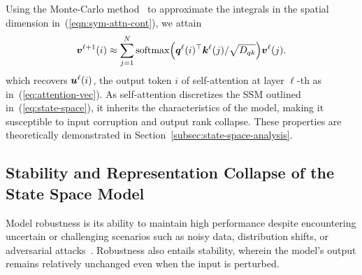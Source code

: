 Using the Monte-Carlo method~\cite{13ab5b5e-0237-33fb-a7a8-6f6e4e0d4e0f} to approximate the integrals in the spatial dimension in~(\ref{eqn:sym-attn-cont}), we attain 
\begin{equation}
\nonumber
\bm{v}^{\ell + 1}(i) \approx \sum_{j=1}^N{\rm softmax}\Big({{\bm q}}^{\ell}(i)^\top{{\bm k}}^{\ell}(j)/\sqrt{D_{qk}}\Big){{\bm v}}^{\ell}(j).
\end{equation}
which recovers ${\bm u}^{\ell}(i)$, the output token $i$ of self-attention at layer $\ell$-th as in~(\ref{eq:attention-vec}). As self-attention discretizes the SSM outlined in~(\ref{eq:state-space}), it inherits the characteristics of the model, making it susceptible to input corruption and output rank collapse. These properties are theoretically demonstrated in Section~\ref{subsec:state-space-analysis}.

\vspace{-2mm}
\subsection{Stability and Representation Collapse of the State Space Model}
Model robustness is its ability to maintain high performance despite encountering uncertain or challenging scenarios such as noisy data, distribution shifts, or adversarial attacks~\cite{wang-bansal-2018-robust,dong2020benchmarking}.
Robustness also entails stability, wherein the model's output remains relatively unchanged even when the input is perturbed.

